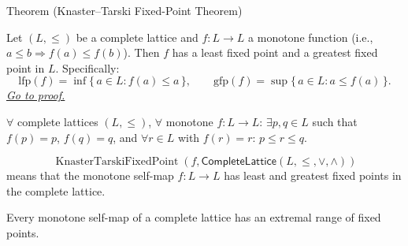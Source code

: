 
\begin{theorembox}{Theorem (Knaster--Tarski Fixed-Point Theorem)}
\begin{theorem}\label{thm:knaster-tarski}
Let $(L, \leq)$ be a complete lattice and $f : L \to L$ a monotone
function (i.e., $a \leq b \Rightarrow f(a) \leq f(b)$).  Then $f$ has a
least fixed point and a greatest fixed point in $L$.  Specifically:
\[
  \mathrm{lfp}(f) = \inf\{\, a \in L : f(a) \leq a \,\},
  \qquad
  \mathrm{gfp}(f) = \sup\{\, a \in L : a \leq f(a) \,\}.
\]
\hyperref[prf:knaster-tarski]{\textit{Go to proof.}}
\end{theorem}
\end{theorembox}

\begin{remark*}
$\forall$ complete lattices $(L,\leq)$, $\forall$ monotone $f : L \to L$:
$\exists p, q \in L$ such that $f(p) = p$, $f(q) = q$, and $\forall r \in L$
with $f(r) = r$: $p \leq r \leq q$.
\end{remark*}

\begin{remark*}
\[
  \operatorname{KnasterTarskiFixedPoint}(f,\mathsf{CompleteLattice}(L,\leq,\vee,\wedge))
\]
means that the monotone self-map $f:L\to L$ has least and greatest fixed
points in the complete lattice.
\end{remark*}

\begin{remark*}[Interpretation]
Every monotone self-map of a complete lattice has an extremal range of fixed
points.
\end{remark*}

